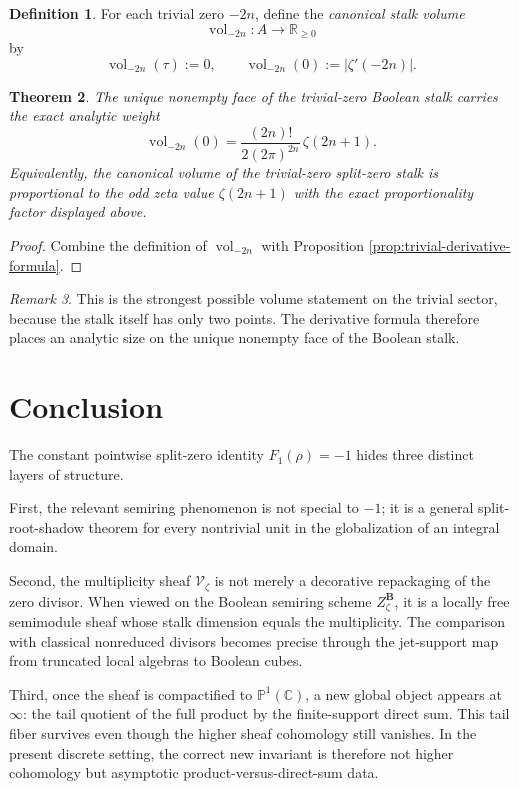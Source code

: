 \documentclass[11pt,a4paper]{article}
\newtheorem{theorem}{Theorem}[section]
\theoremstyle{definition}
\newtheorem{definition}[theorem]{Definition}
\theoremstyle{remark}
\newtheorem{remark}[theorem]{Remark}
\DeclareMathOperator{\vol}{vol}
\newcommand{\CC}{\mathbb C}
\newcommand{\RR}{\mathbb R}
\newcommand{\PP}{\mathbb P}
\newcommand{\BB}{\mathbf B}
\newcommand{\Vzet}{\mathcal V_{\zeta}}
\newcommand{\taup}{\tau}
\begin{document}
\begin{definition}
For each trivial zero $-2n$, define the \emph{canonical stalk volume}
\[
\vol_{-2n}:A\to\RR_{\ge0}
\]
by
\[
\vol_{-2n}(\taup):=0,
\qquad
\vol_{-2n}(0):=|\zeta'(-2n)|.
\]
\end{definition}

\begin{theorem}\label{thm:trivial-volume}
The unique nonempty face of the trivial-zero Boolean stalk carries the exact analytic weight
\[
\vol_{-2n}(0)=\frac{(2n)!}{2(2\pi)^{2n}}\,\zeta(2n+1).
\]
Equivalently, the canonical volume of the trivial-zero split-zero stalk is proportional to the odd zeta value $\zeta(2n+1)$ with the exact proportionality factor displayed above.
\end{theorem}

\begin{proof}
Combine the definition of $\vol_{-2n}$ with Proposition \ref{prop:trivial-derivative-formula}.
\end{proof}

\begin{remark}
This is the strongest possible volume statement on the trivial sector, because the stalk itself has only two points.  The derivative formula therefore places an analytic size on the unique nonempty face of the Boolean stalk.
\end{remark}

\section{Conclusion}

The constant pointwise split-zero identity $F_1(\rho)=-1$ hides three distinct layers of structure.

First, the relevant semiring phenomenon is not special to $-1$; it is a general split-root-shadow theorem for every nontrivial unit in the globalization of an integral domain.

Second, the multiplicity sheaf $\Vzet$ is not merely a decorative repackaging of the zero divisor.  When viewed on the Boolean semiring scheme $Z_\zeta^{\BB}$, it is a locally free semimodule sheaf whose stalk dimension equals the multiplicity.  The comparison with classical nonreduced divisors becomes precise through the jet-support map from truncated local algebras to Boolean cubes.

Third, once the sheaf is compactified to $\PP^1(\CC)$, a new global object appears at $\infty$: the tail quotient of the full product by the finite-support direct sum.  This tail fiber survives even though the higher sheaf cohomology still vanishes.  In the present discrete setting, the correct new invariant is therefore not higher cohomology but asymptotic product-versus-direct-sum data.
\end{document}
